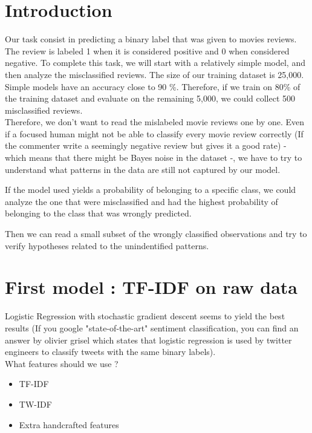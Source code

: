 \documentclass{report}
\begin{document}
\maketitle

\section{Introduction}
Our task consist in predicting a binary label that was given to movies reviews. The review is labeled 1 when it is considered positive and 0 when considered negative. To complete this task, we will start with a relatively simple model, and then analyze the misclassified reviews. The size of our training dataset is 25,000. Simple models have an accuracy close to 90 \%. Therefore, if we train on 80\% of the training dataset and evaluate on the remaining 5,000, we could collect 500 misclassified reviews.
\\
Therefore, we don't want to read the mislabeled movie reviews one by one. Even if a focused human might not be able to classify every movie review correctly (If the commenter write a seemingly negative review but gives it a good rate) - which means that there might be Bayes noise in the dataset -, we have to try to understand what patterns in the data are still not captured by our model. 

If the model used yields a probability of belonging to a specific class, we could analyze the one that were misclassified and had the highest probability of belonging to the class that was wrongly predicted.

Then we can read a small subset of the wrongly classified observations and try to verify hypotheses related to the unindentified patterns.


\section{First model : TF-IDF on raw data}

Logistic Regression with stochastic gradient descent seems to yield the best results (If you google "state-of-the-art" sentiment classification, you can find an answer by olivier grisel which states that logistic regression is used by twitter engineers to classify tweets with the same binary labels).\\

What features should we use ?

\begin{itemize}
	\item TF-IDF
	\item TW-IDF
	\item Extra handcrafted features
\end{itemize} 
\end{document}
